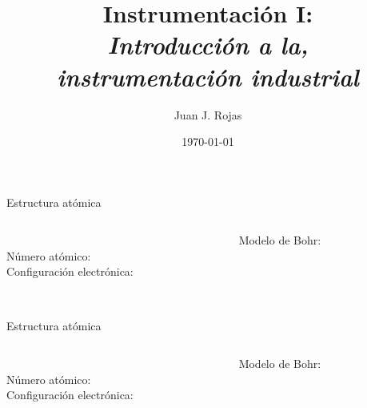 \documentclass[aspectratio=169]{beamer}
\title{Instrumentación I: \\ \emph{Introducción a la,}\\ \emph{instrumentación industrial}}
\author{
    Juan J. Rojas
}
\institute{Instituto Tecnológico de Costa Rica}
\date{\today}
\begin{document}

\maketitle

\begin{frame}{Estructura atómica}
    \begin{columns}[onlytextwidth]
    \begin{column}{0.6\textwidth}
        \textbf{}\\[8pt]
        Número atómico: \\[8pt]
        Configuración electrónica:\\[8pt] 
        \\[8pt]  
        \end{column}
    \begin{column}{0.4\textwidth}
    \begin{center}
        Modelo de Bohr:\\[8pt]
    \end{center}
\end{column}
\end{columns}
\end{frame}

\begin{frame}{Estructura atómica}
    \begin{columns}[onlytextwidth]
    \begin{column}{0.6\textwidth}
        \textbf{}\\[8pt]
        Número atómico: \\[8pt]
        Configuración electrónica:\\[8pt] 
        \\[8pt]  
        \end{column}
    \begin{column}{0.4\textwidth}
    \begin{center}
        Modelo de Bohr:\\[8pt]
    \end{center}
\end{column}
\end{columns}
\end{frame}
\end{document}

